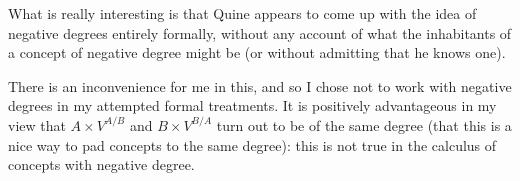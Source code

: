 \documentclass{slides}
\begin{document}
\begin{slide}
What is really interesting is that Quine appears to come up with the idea of negative degrees entirely formally, without any account of what the inhabitants of a concept of negative degree might be (or without admitting that he knows one).

There is an inconvenience for me in this, and so I chose not to work with negative degrees in my attempted formal treatments.  It is positively advantageous
in my view that $A \times V^{A/B}$ and $B \times V^{B/A}$ turn out to be of the same degree (that this is a nice way to pad concepts to the same degree):  this is not true in the calculus of concepts with negative degree.

\end{slide}
\end{document}
